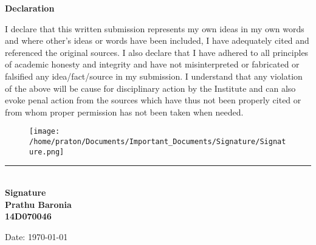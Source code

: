 \thispagestyle{empty}

\begin{center}
{\Large \textbf{Declaration}}%
\end{center}

\setlength{\parindent}{0em}
I declare that this written submission represents my own ideas in my own words and where other's ideas or words have been included, I have
adequately cited and referenced the original sources. I also declare that I have adhered to all principles of academic honesty and integrity
and have not misinterpreted or fabricated or falsified any idea/fact/source in my submission. I understand that any violation of the above
will be cause for disciplinary action by the Institute and can also evoke penal action from the sources which have thus not been properly
cited or from whom proper permission has not been taken when needed.

\vspace{2cm}


\begin{flushright}
\begin{figure}[H]
\texttt{[image: /home/praton/Documents/Important\_Documents/Signature/Signature.png]}
\end{figure}
\vspace{-1cm}
\rule{6cm}{.4pt}\\
\textbf{Signature} \\
\vspace{1cm}
\textbf{Prathu Baronia} \\
\textbf{14D070046} \\
\vspace{2cm}
\end{flushright}

\begin{flushleft}
Date: \today\\
\end{flushleft}

\afterpage{\blankpage}
\clearpage
